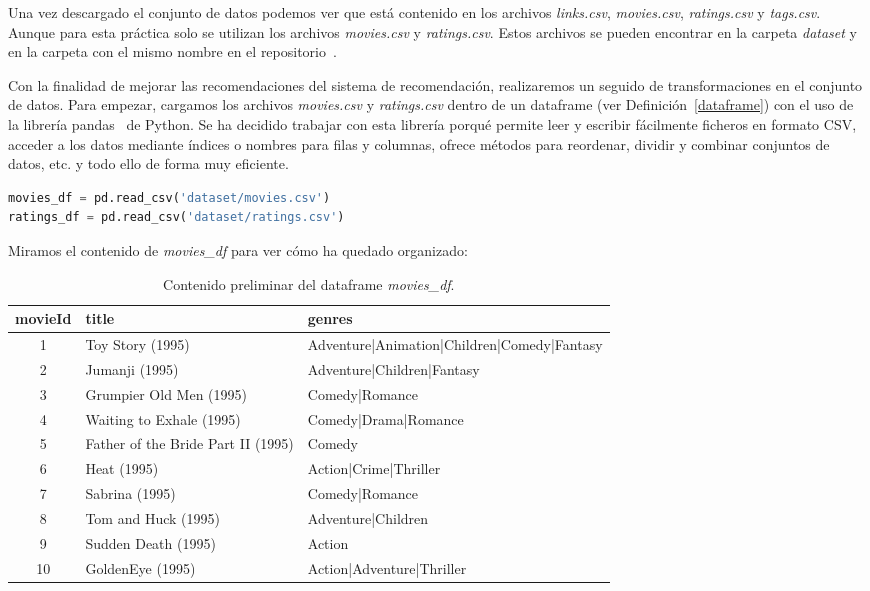 \documentclass{uimppracticas}
\begin{document}
Una vez descargado el conjunto de datos podemos ver que está contenido en los archivos \textit{links.csv}, \textit{movies.csv}, \textit{ratings.csv} y \textit{tags.csv}. Aunque para esta práctica solo se utilizan los archivos \textit{movies.csv} y \textit{ratings.csv}. Estos archivos se pueden encontrar en la carpeta \textit{dataset} y en la carpeta con el mismo nombre en el repositorio~\cite{GitHubRepo}.

Con la finalidad de mejorar las recomendaciones del sistema de recomendación, realizaremos un seguido de transformaciones en el conjunto de datos. Para empezar, cargamos los archivos \textit{movies.csv} y \textit{ratings.csv} dentro de un dataframe (ver Definición~\ref{dataframe}) con el uso de la librería pandas~\cite{pandas} de Python. Se ha decidido trabajar con esta librería porqué permite leer y escribir fácilmente ficheros en formato CSV, acceder a los datos mediante índices o nombres para filas y columnas, ofrece métodos para reordenar, dividir y combinar conjuntos de datos, etc. y todo ello de forma muy eficiente.

\begin{lstlisting}[language=python, basicstyle=\small]
movies_df = pd.read_csv('dataset/movies.csv')
ratings_df = pd.read_csv('dataset/ratings.csv')
\end{lstlisting}

Miramos el contenido de \textit{movies\_df} para ver cómo ha quedado organizado:

\begin{table}[H]
	\centering
	\begin{tabular}{cll}
		\toprule
		movieId &                         title &                                       genres \\
		\midrule
		1 &                    Toy Story (1995) &  Adventure|Animation|Children|Comedy|Fantasy \\
		2 &                      Jumanji (1995) &                   Adventure|Children|Fantasy \\
		3 &             Grumpier Old Men (1995) &                               Comedy|Romance \\
		4 &            Waiting to Exhale (1995) &                         Comedy|Drama|Romance \\
		5 &  Father of the Bride Part II (1995) &                                       Comedy \\
		6 &                         Heat (1995) &                        Action|Crime|Thriller \\
		7 &                      Sabrina (1995) &                               Comedy|Romance \\
		8 &                 Tom and Huck (1995) &                           Adventure|Children \\
		9 &                 Sudden Death (1995) &                                       Action \\
		10 &                    GoldenEye (1995) &                    Action|Adventure|Thriller \\
		\bottomrule
	\end{tabular}
	\caption{Contenido preliminar del dataframe \textit{movies\_df}.}
	\label{movies_df}
\end{table}
\end{document}
